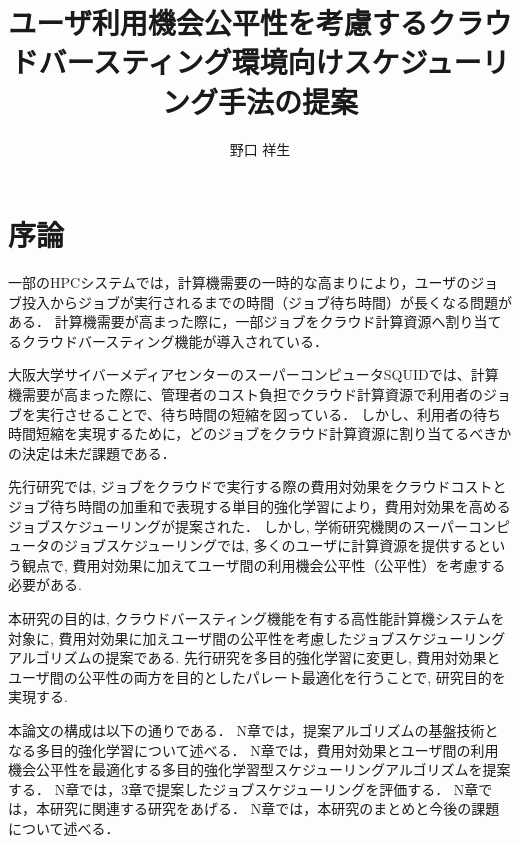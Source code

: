 \documentclass[12pt,oneside]{ise-thesis} %
\title{ユーザ利用機会公平性を考慮するクラウドバースティング環境向けスケジューリング手法の提案}
\author{野口 祥生}
\begin{document}
\coverpage

\tableofcontents

\body

\chapter{序論}

一部のHPCシステムでは，計算機需要の一時的な高まりにより，ユーザのジョブ投入からジョブが実行されるまでの時間（ジョブ待ち時間）が長くなる問題がある．
計算機需要が高まった際に，一部ジョブをクラウド計算資源へ割り当てるクラウドバースティング機能が導入されている．

大阪大学サイバーメディアセンターのスーパーコンピュータSQUIDでは、計算機需要が高まった際に、管理者のコスト負担でクラウド計算資源で利用者のジョブを実行させることで、待ち時間の短縮を図っている．
しかし、利用者の待ち時間短縮を実現するために，どのジョブをクラウド計算資源に割り当てるべきかの決定は未だ課題である．

先行研究では, ジョブをクラウドで実行する際の費用対効果をクラウドコストとジョブ待ち時間の加重和で表現する単目的強化学習により，費用対効果を高めるジョブスケジューリングが提案された．
しかし, 学術研究機関のスーパーコンピュータのジョブスケジューリングでは, 多くのユーザに計算資源を提供するという観点で, 費用対効果に加えてユーザ間の利用機会公平性（公平性）を考慮する必要がある. 



本研究の目的は, クラウドバースティング機能を有する高性能計算機システムを対象に, 費用対効果に加えユーザ間の公平性を考慮したジョブスケジューリングアルゴリズムの提案である. 
先行研究を多目的強化学習に変更し, 費用対効果とユーザ間の公平性の両方を目的としたパレート最適化を行うことで, 研究目的を実現する.

本論文の構成は以下の通りである．
N章では，提案アルゴリズムの基盤技術となる多目的強化学習について述べる．
N章では，費用対効果とユーザ間の利用機会公平性を最適化する多目的強化学習型スケジューリングアルゴリズムを提案する．
N章では，3章で提案したジョブスケジューリングを評価する．
N章では，本研究に関連する研究をあげる．
N章では，本研究のまとめと今後の課題について述べる．
\end{document}
